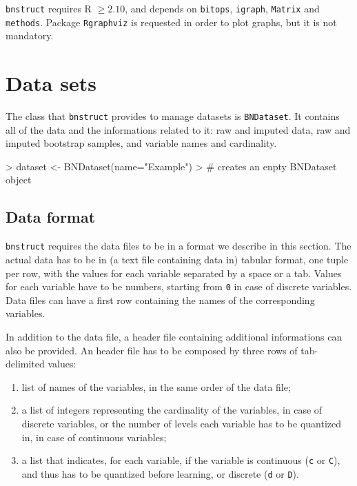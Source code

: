 \documentclass{article}
\newcommand{\Robject}[1]{{\texttt{#1}}}
\newcommand{\Rpackage}[1]{{\texttt{#1}}}
\begin{document}
\Rpackage{bnstruct} requires R $\geq 2.10$,
and depends on \Rpackage{bitops}, \Rpackage{igraph}, \Rpackage{Matrix} and \Rpackage{methods}.
Package \Rpackage{Rgraphviz} is requested in order to plot graphs, but it is not mandatory.


\section{Data sets}
The class that \Rpackage{bnstruct} provides to manage datasets is \Robject{BNDataset}.
It contains all of the data and the informations related to it: raw and imputed data, raw and imputed
bootstrap samples, and variable names and cardinality.

\begin{Schunk}
\begin{Sinput}
> dataset <- BNDataset(name="Example")
> # creates an enpty BNDataset object
\end{Sinput}
\end{Schunk}


\subsection{Data format}
\Rpackage{bnstruct} requires the data files to be in a format we describe in this section. 
The actual data has to be in (a text file containing data in) tabular format, one tuple per row,
with the values for each variable separated by a space or a tab. Values for each variable have to be
numbers, starting from \texttt{0} in case of discrete variables.
Data files can have a first row containing the names of the corresponding variables.

In addition to the data file, a header file containing additional informations can also be provided.
An header file has to be composed by three rows of tab-delimited values:
\begin{enumerate}
\item list of names of the variables, in the same order of the data file;
\item a list of integers representing the cardinality of the variables, in case of discrete variables,
      or the number of levels each variable has to be quantized in, in case of continuous variables;
\item a list that indicates, for each variable, if the variable is continuous (\texttt{c} or \texttt{C}), and thus has to be quantized before learning,
 or discrete (\texttt{d} or \texttt{D}).
\end{enumerate}
\end{document}
